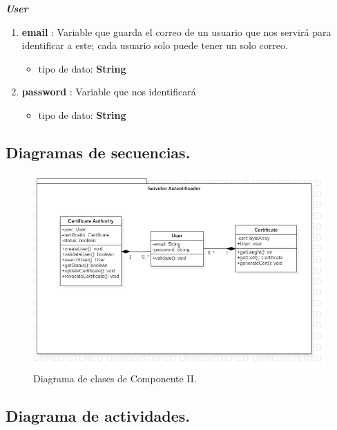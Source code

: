 \documentclass[12pt, a4paper, titlepage]{report}
\begin{document}
			    \textbf{\textit{User}}
			    \begin{enumerate}
			        \item \textbf{email} : Variable que guarda el correo de un usuario que nos servirá para identificar a este; cada usuario solo puede tener un solo correo.
			        \begin{itemize}
			            \item tipo de dato: \textbf{String}
			        \end{itemize}
			        
			        \item \textbf{password} : Variable que nos identificará 
			        \begin{itemize}
			            \item tipo de dato: \textbf{String}
			        \end{itemize}
			    \end{enumerate}
			    
			    
		
		\subsection{Diagramas de secuencias.}
		
		\begin{figure}[H]
        	\begin{center}	\includegraphics[width=13cm]{./imagenes/Disenio/Componente_2/C2_DC_P1.png}
        	\caption{Diagrama de clases de Componente II.}
        	\end{center}
		\end{figure}
		
	    \subsection{Diagrama de actividades.}
	
\end{document}
